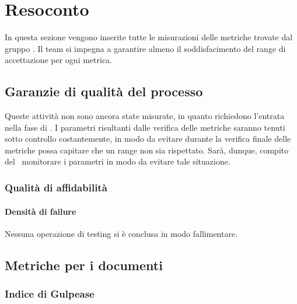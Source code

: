 \section{Resoconto}

In questa sezione vengono inserite tutte le misurazioni delle metriche trovate dal gruppo \gruppo.
Il team si impegna a garantire almeno il soddisfacimento del range di accettazione per ogni metrica.


\subsection{Garanzie di qualità del processo}

Queste attività non sono ancora state misurate, in quanto richiedono l'entrata nella fase di \COD. I parametri risultanti dalle verifica delle metriche saranno tenuti sotto controllo costantemente, in modo da evitare durante la verifica finale delle metriche possa capitare che un range non sia rispettato. Sarà, dunque, compito del \Ver\ monitorare i parametri in modo da evitare tale situazione.

\subsubsection{Qualità di affidabilità}

\paragraph{Densità di failure}

Nessuna operazione di testing si è conclusa in modo fallimentare.

\subsection{Metriche per i documenti}

\subsubsection{Indice di Gulpease}

